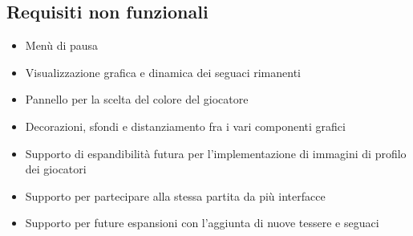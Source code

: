 \subsection*{Requisiti non funzionali}
\begin{itemize}
\item Menù di pausa
\end{itemize}
\begin{itemize}
\item Visualizzazione grafica e dinamica dei seguaci rimanenti 
\end{itemize}
\begin{itemize}
\item Pannello per la scelta del colore del giocatore
\end{itemize}
\begin{itemize}
\item Decorazioni, sfondi e distanziamento fra i vari componenti grafici
\end{itemize}
\begin{itemize}
\item Supporto di espandibilità futura per l'implementazione di immagini di profilo dei giocatori
\end{itemize}
\begin{itemize}
\item Supporto per partecipare alla stessa partita da più interfacce
\end{itemize}
\begin{itemize}
\item Supporto per future espansioni con l'aggiunta di nuove tessere e seguaci
\end{itemize}

